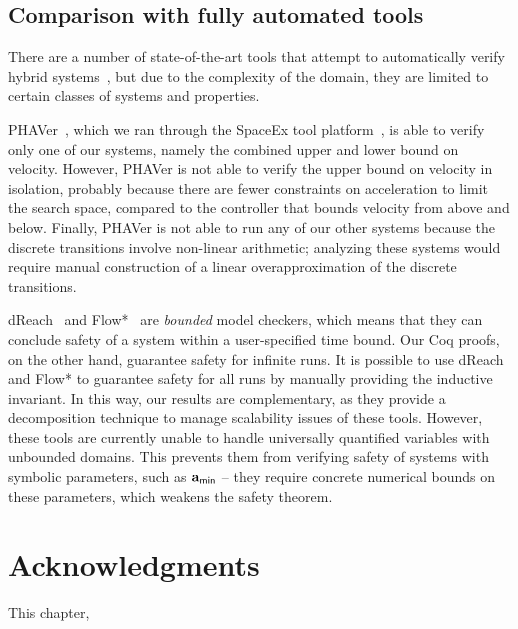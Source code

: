 \subsection{Comparison with fully automated tools}
There are a number of state-of-the-art tools that attempt to automatically
verify hybrid
systems~\cite{PHAVerSTTT08,chen2015flow,kong2015dreach,HyTechCAV97}, but
due to the complexity of the domain, they are limited to certain classes of
systems and properties.

PHAVer~\cite{PHAVerSTTT08}, which we ran through the SpaceEx tool
platform~\cite{frehse2011spaceex-small}, is able to verify only one of our
systems, namely the combined upper and lower bound on velocity.  However,
PHAVer is not able to verify the upper bound on velocity in isolation,
probably because there are fewer constraints on acceleration to limit the
search space, compared to the controller that bounds velocity from above
and below.  Finally, PHAVer is not able to run any of our other systems
because the discrete transitions involve non-linear arithmetic; analyzing
these systems would require manual construction of a linear
overapproximation of the discrete transitions.

dReach~\cite{kong2015dreach} and Flow*~\cite{chen2015flow}
are \emph{bounded} model checkers, which means that they can conclude
safety of a system within a user-specified time bound.  Our Coq proofs, on
the other hand, guarantee safety for infinite runs.  It is possible to use
dReach and Flow* to guarantee safety for all runs by manually providing the
inductive invariant.  In this way, our results are complementary, as they
provide a decomposition technique to manage scalability issues of these
tools.  However, these tools are currently unable to handle universally
quantified variables with unbounded domains.  This prevents them from
verifying safety of systems with symbolic parameters, such as $\mathbf{a}_{\mathsf{min}}$ --
they require concrete numerical bounds on these parameters, which weakens
the safety theorem.

\section{Acknowledgments}
This chapter, \emsoftack{}
